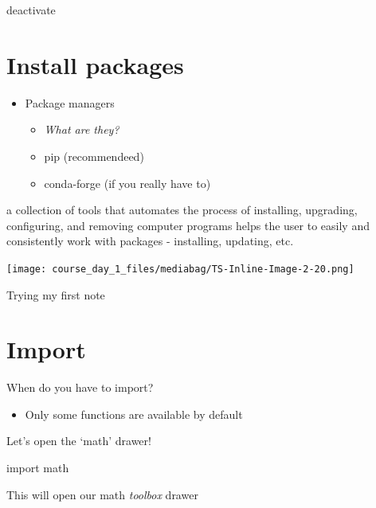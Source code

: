 \documentclass[
  letterpaper,
  DIV=11,
  numbers=noendperiod]{scrartcl}
\newenvironment{Shaded}{\begin{snugshade}}{\end{snugshade}}
\newcommand{\ExtensionTok}[1]{\textcolor[rgb]{0.00,0.23,0.31}{#1}}
\newcommand{\ImportTok}[1]{\textcolor[rgb]{0.00,0.46,0.62}{#1}}
\newcommand{\NormalTok}[1]{\textcolor[rgb]{0.00,0.23,0.31}{#1}}
\providecommand{\tightlist}{%
  \setlength{\itemsep}{0pt}\setlength{\parskip}{0pt}}\usepackage{longtable,booktabs,array}
\begin{document}
\begin{Shaded}
\begin{Highlighting}[]
\ExtensionTok{deactivate}
\end{Highlighting}
\end{Shaded}

\section{Install packages}\label{install-packages}

\begin{itemize}
\tightlist
\item
  Package managers

  \begin{itemize}
  \item
    \emph{What are they?}
  \item
    pip (recommendeed)
  \item
    conda-forge (if you really have to)
  \end{itemize}
\end{itemize}

a collection of tools that automates the process of installing,
upgrading, configuring, and removing computer programs helps the user to
easily and consistently work with packages - installing, updating, etc.

\texttt{[image: course\_day\_1\_files/mediabag/TS-Inline-Image-2-20.png]}

Trying my first note

\section{Import}\label{import}

When do you have to import?

\begin{itemize}
\tightlist
\item
  Only some functions are available by default
\end{itemize}

Let's open the `math' drawer!

\begin{Shaded}
\begin{Highlighting}[]
\ImportTok{import}\NormalTok{ math}
\end{Highlighting}
\end{Shaded}

This will open our math \emph{toolbox} drawer
\end{document}
